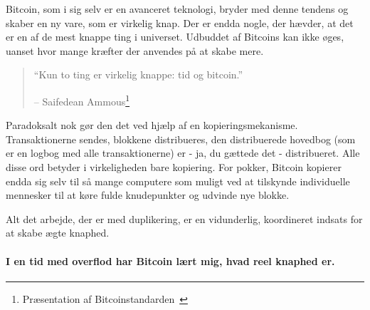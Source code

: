 \documentclass[paper=6in:9in,pagesize=pdftex,headinclude=on,footinclude=on,12pt]{scrbook}
\begin{document}
Bitcoin, som i sig selv er en avanceret teknologi, bryder med denne tendens og skaber en ny vare, som er virkelig knap. Der er endda nogle, der hævder, at det er en af de mest knappe ting i universet. Udbuddet af Bitcoins kan ikke øges, uanset hvor mange kræfter der anvendes på at skabe mere.\begin{quotation}\begin{samepage} \enquote{Kun to ting er virkelig knappe: tid og bitcoin.} \begin{flushright} -- Saifedean Ammous\footnote{Præsentation af Bitcoinstandarden~\cite{bitcoinstandard-pres}}
\end{flushright}\end{samepage}\end{quotation}

Paradoksalt nok gør den det ved hjælp af en kopieringsmekanisme. Transaktionerne sendes, blokkene distribueres, den distribuerede hovedbog (som er en logbog med alle transaktionerne) er - ja, du gættede det - distribueret. Alle disse ord betyder i virkeligheden bare kopiering. For pokker, Bitcoin kopierer endda sig selv til så mange computere som muligt ved at tilskynde individuelle mennesker til at køre fulde knudepunkter og udvinde nye blokke.

Alt det arbejde, der er med duplikering, er en vidunderlig, koordineret indsats for at skabe ægte knaphed.\paragraph{I en tid med overflod har Bitcoin lært mig, hvad reel knaphed er.}%
%
%
%
%
%
%
%
\end{document}
